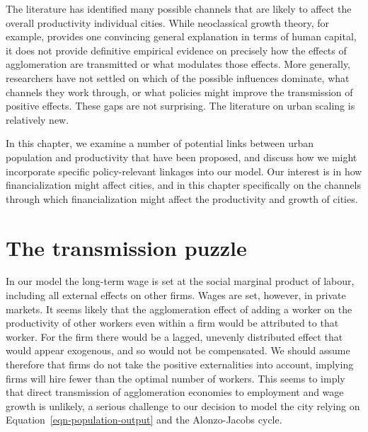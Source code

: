  The literature has identified many possible channels that are likely to affect the overall productivity individual cities. 
 While neoclassical growth theory, for example, provides one convincing general explanation in terms of human capital, it does not provide definitive empirical evidence on precisely how the effects of agglomeration are transmitted or what modulates those effects. More generally, researchers have not settled on which  of the possible influences dominate, what channels they work through, or what policies might improve the transmission of positive effects. These gaps are  not surprising. The literature on urban scaling is relatively new.  

  In this chapter, we examine a number of potential  links between urban population and productivity that have been proposed, and discuss how we  might incorporate specific policy-relevant linkages into our model.  Our interest is in how financialization might affect cities, and in this chapter specifically on the channels through which financialization might affect the productivity and growth of cities.



\section{The transmission puzzle}
 In our model the long-term wage is set at the social marginal product of labour, including all external effects on other firms. Wages are set, however, in private markets. It seems likely that the agglomeration effect of adding a worker on the productivity of other workers even within a firm  would be attributed to that worker. For the firm there  would be a lagged, unevenly distributed effect that would appear exogenous, and so would not be
compensated. We should  assume therefore that firms do not take the positive externalities into account, implying firms will hire fewer than the optimal number of workers. This seems to imply that direct transmission of agglomeration economies to employment and wage growth is unlikely,  a serious challenge to our decision to model the city relying on Equation~\ref{eqn-population-output} and the  Alonzo-Jacobs cycle.


